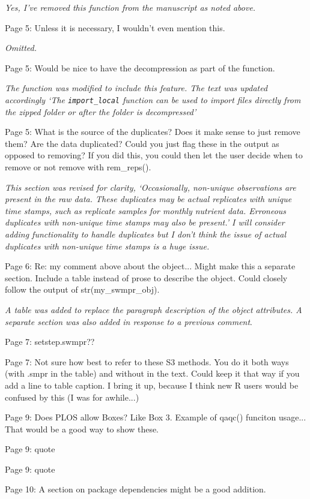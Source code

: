 \documentclass[letterpaper,12pt]{article}\usepackage[]{graphicx}\usepackage[]{color}
\begin{document}
{\it Yes, I've removed this function from the manuscript as noted above.}

Page 5: Unless it is necessary, I wouldn't even mention this.

{\it Omitted.}

Page 5: Would be nice to have the decompression as part of the function.

{\it The function was modified to include this feature.  The text was updated accordingly `The \texttt{import\_local} function can be used to import files directly from the zipped folder or after the folder is decompressed'}

Page 5: What is the source of the duplicates? Does it make sense to just remove them? Are the data duplicated? Could you just flag these in the output as opposed to removing? If you did this, you could then let the user decide when to remove or not remove with rem\_reps().

{\it This section was revised for clarity, `Occasionally, non-unique observations are present in the raw data.  These duplicates may be actual replicates with unique time stamps, such as replicate samples for monthly nutrient data.  Erroneous duplicates with non-unique time stamps may also be present.'  I will consider adding functionality to handle duplicates but I don't think the issue of actual duplicates with non-unique time stamps is a huge issue.}

Page 6: Re: my comment above about the object... Might make this a separate section. Include a table instead of prose to describe the object. Could closely follow the output of str(my\_swmpr\_obj).

{\it A table was added to replace the paragraph description of the object attributes.  A separate section was also added in response to a previous comment}.

Page 7: setstep.swmpr??

Page 7: Not sure how best to refer to these S3 methods. You do it both ways (with .smpr in the table) and without in the text. Could keep it that way if you add a line to table caption. I bring it up, because I think new R users would be confused by this (I was for awhile...)

Page 9: Does PLOS allow Boxes? Like Box 3. Example of qaqc() funciton usage... That would be a good way to show these.

Page 9: quote

Page 9: quote

Page 10: A section on package dependencies might be a good addition.
\end{document}

